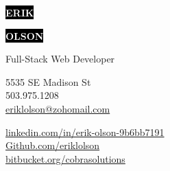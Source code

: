 \documentclass[9pt]{developercv} %
\begin{document}

\begin{minipage}[t]{0.45\textwidth} %
	\vspace{-\baselineskip} %
	
	\colorbox{black}{{\HUGE\textcolor{white}{\textbf{\MakeUppercase{Erik}}}}} %
	
	\colorbox{black}{{\HUGE\textcolor{white}{\textbf{\MakeUppercase{Olson}}}}} %
	
	\vspace{5pt}
	
	{\huge Full-Stack Web Developer} %
\end{minipage}
\begin{minipage}[t]{0.275\textwidth} %
	\vspace{-\baselineskip} %
	
	{5535 SE Madison St}\\
	{503.975.1208}\\
	{\href{mailto:eriklolson@zohomail.com}{eriklolson@zohomail.com}}\\	
\end{minipage}
\begin{minipage}[t]{0.375\textwidth} %
	\vspace{-\baselineskip} %
	
	{\href{https://linkedin.com/in/erik-olson-9b6bb7191}{linkedin.com/in/erik-olson-9b6bb7191}}\\
	{\href{https://Github.com/eriklolson}{Github.com/eriklolson}}\\
	{\href{https://bitbucket.org/cobrasolutions/}{bitbucket.org/cobrasolutions}}\\
\end{minipage}
\end{document}
